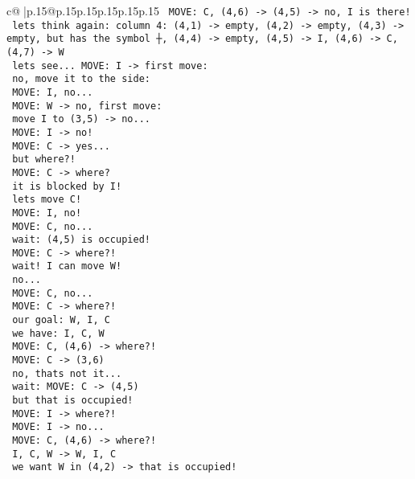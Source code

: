 \documentclass{article}
\begin{document}
{\begin{supertabular}{c@{$\;$}|p{.15\linewidth}@{}p{.15\linewidth}p{.15\linewidth}p{.15\linewidth}p{.15\linewidth}p{.15\linewidth}}
{{{\texttt{ MOVE: C, (4,6) {-}> (4,5) {-}> no, I is there!} \\
\texttt{ lets think again: column 4: (4,1) {-}> empty, (4,2) {-}> empty, (4,3) {-}> empty, but has the symbol ┼, (4,4) {-}> empty, (4,5) {-}> I, (4,6) {-}> C, (4,7) {-}> W} \\
\texttt{ lets see... MOVE: I {-}> first move: } \\
\texttt{ no, move it to the side: } \\
\texttt{ MOVE: I, no...} \\
\texttt{ MOVE: W {-}> no, first move: } \\
\texttt{ move I to (3,5) {-}> no...} \\
\texttt{ MOVE: I {-}> no!} \\
\texttt{ MOVE: C {-}> yes...} \\
\texttt{ but where?!} \\
\texttt{ MOVE: C {-}> where? } \\
\texttt{ it is blocked by I!} \\
\texttt{ lets move C!} \\
\texttt{ MOVE: I, no!} \\
\texttt{ MOVE: C, no... } \\
\texttt{ wait: (4,5) is occupied!} \\
\texttt{ MOVE: C {-}> where?!} \\
\texttt{ wait! I can move W!} \\
\texttt{ no...} \\
\texttt{ MOVE: C, no...} \\
\texttt{ MOVE: C {-}> where?!} \\
\texttt{ our goal: W, I, C } \\
\texttt{ we have: I, C, W } \\
\texttt{ MOVE: C, (4,6) {-}> where?!} \\
\texttt{ MOVE: C {-}> (3,6) } \\
\texttt{ no, thats not it...} \\
\texttt{ wait: MOVE: C {-}> (4,5) } \\
\texttt{ but that is occupied!} \\
\texttt{ MOVE: I {-}> where?!} \\
\texttt{ MOVE: I {-}> no...} \\
\texttt{ MOVE: C, (4,6) {-}> where?!} \\
\texttt{ I, C, W {-}> W, I, C} \\
\texttt{ we want W in (4,2) {-}> that is occupied!} \\
}}}
\end{supertabular}}
\end{document}
